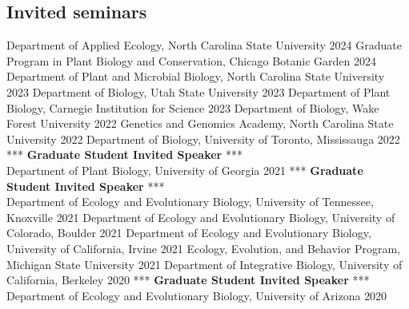 \documentclass[11pt,english]{article}\usepackage[]{graphicx}\usepackage[]{xcolor}
\providecommand{\tabularnewline}{\\}
\begin{document}
\subsection*{Invited seminars}
\vspace{-1ex}

Department of Applied Ecology, North Carolina State University \hfill{2024} \newline
Graduate Program in Plant Biology and Conservation, Chicago Botanic Garden \hfill{2024} \newline
Department of Plant and Microbial Biology, North Carolina State University \hfill{2023} \newline
Department of Biology, Utah State University \hfill{2023} \newline
Department of Plant Biology, Carnegie Institution for Science \hfill{2023} \newline
Department of Biology, Wake Forest University \hfill{2022} \newline
Genetics and Genomics Academy, North Carolina State University \hfill{2022} \newline
Department of Biology, University of Toronto, Mississauga \hfill{2022} \newline
\hspace{7mm} *** \textbf{Graduate Student Invited Speaker} *** \tabularnewline
Department of Plant Biology, University of Georgia \hfill{2021} \newline
\hspace{7mm} *** \textbf{Graduate Student Invited Speaker} *** \tabularnewline
Department of Ecology and Evolutionary Biology, University of Tennessee, Knoxville \hfill{2021} \newline
Department of Ecology and Evolutionary Biology, University of Colorado, Boulder \hfill{2021} \newline
Department of Ecology and Evolutionary Biology, University of California, Irvine \hfill{2021} \newline
Ecology, Evolution, and Behavior Program, Michigan State University \hfill{2021} \newline
Department of Integrative Biology, University of California, Berkeley \hfill{2020} \newline
\hspace{7mm} *** \textbf{Graduate Student Invited Speaker} *** \tabularnewline
Department of Ecology and Evolutionary Biology, University of Arizona \hfill{2020} \newline
\end{document}
